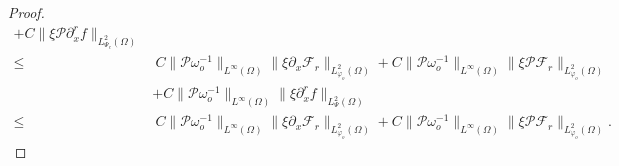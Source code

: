 \documentclass{amsart}
\numberwithin{equation}{section}
\begin{document}
\begin{proof}
\begin{align}
     +C\|\xi\mathcal{P}\partial_{x}^{r}f\|_{L_{\Psi_{c}}^{2}(\Omega)}\nonumber\\
\leq&~C\|\mathcal{P}\omega_{o}^{-1}\|_{L^{\infty}(\Omega)}\|\xi\partial_{x}\mathcal{F}_{r}\|_{L_{\varphi_{o}}^{2}(\Omega)}
     +C\|\mathcal{P}\omega_{o}^{-1}\|_{L^{\infty}(\Omega)}\|\xi\mathcal{P}\mathcal{F}_{r}\|_{L_{\varphi_{o}}^{2}(\Omega)}\nonumber\\
    &+C\|\mathcal{P}\omega_{o}^{-1}\|_{L^{\infty}(\Omega)}\|\xi\partial_{x}^{r}f\|_{L_{\Psi}^{2}(\Omega)}\nonumber\\
\leq&~C\|\mathcal{P}\omega_{o}^{-1}\|_{L^{\infty}(\Omega)}\|\xi\partial_{x}\mathcal{F}_{r}\|_{L_{\varphi_{o}}^{2}(\Omega)}
     +C\|\mathcal{P}\omega_{o}^{-1}\|_{L^{\infty}(\Omega)}\|\xi\mathcal{P}\mathcal{F}_{r}\|_{L_{\varphi_{o}}^{2}(\Omega)}.\nonumber
\end{align}
\end{proof}
\end{document}
